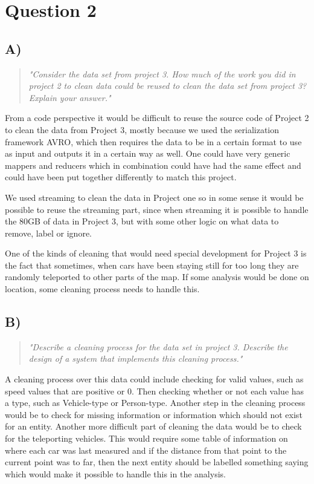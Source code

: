 \section{Question 2}

\subsection{A)}
\begin{quote}
	\textit{"Consider	the	data	set	from	project	3.	How	much	of	the	work	you	did	in	project	2	to	clean	data	could	be	reused	to	clean	the	data	set	from	project	3?	Explain	your	answer."}
\end{quote}
From a code perspective it would be difficult to reuse the source code of Project 2 to clean the data from Project 3, mostly because we used the serialization framework AVRO, which then requires the data to be in a certain format to use as input and outputs it in a certain way as well. One could have very generic mappers and reducers which in combination could have had the same effect and could have been put together differently to match this project. 

We used streaming to clean the data in Project one so in some sense it would be possible to reuse the streaming part, since when streaming it is possible to handle the 80GB of data in Project 3, but with some other logic on what data to remove, label or ignore.

One of the kinds of cleaning that would need special development for Project 3 is the fact that sometimes, when cars have been staying still for too long they are randomly teleported to other parts of the map. If some analysis would be done on location, some cleaning process needs to handle this.

\subsection{B)}
\begin{quote}
	\textit{"Describe	a	cleaning	process	for	the	data	set	in	project	3.	Describe	the	design	of	a	system	that	implements	this	cleaning	process."}
\end{quote}
A cleaning process over this data could include checking for valid values, such as speed values that are positive or 0. Then checking whether or not each value has a type, such as Vehicle-type or Person-type. Another step in the cleaning process would be to check for missing information or information which should not exist for an entity. Another more difficult part of cleaning the data would be to check for the teleporting vehicles. This would require some table of information on where each car was last measured and if the distance from that point to the current point was to far, then the next entity should be labelled something saying which would make it possible to handle this in the analysis.

